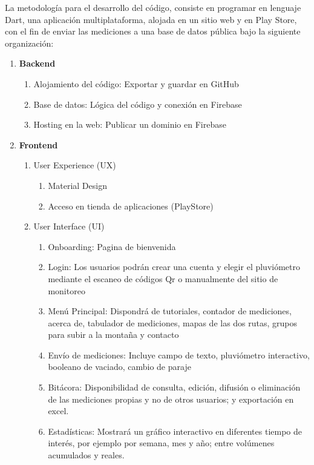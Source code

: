 La metodología para el desarrollo del código, consiste en programar en lenguaje Dart, una aplicación multiplataforma, alojada en un sitio web y en Play Store, con el fin de enviar las mediciones a una base de datos pública bajo la siguiente organización:


\begin{enumerate}
  \item \textbf{Backend}
  \begin{enumerate}
    \item Alojamiento del código: Exportar y guardar en GitHub
    \item Base de datos: Lógica del código y conexión en Firebase
    \item Hosting en la web: Publicar un dominio en Firebase
  \end{enumerate}
  \item \textbf{Frontend}
  \begin{enumerate}
    \item User Experience (UX)
     \begin{enumerate}
      \item Material Design
      \item Acceso en tienda de aplicaciones (PlayStore)
     \end{enumerate}
    \item User Interface (UI)
    \begin{enumerate}
    \item Onboarding: Pagina de bienvenida 
    \item Login: Los usuarios podrán crear una cuenta y elegir el pluviómetro mediante el escaneo de códigos Qr o manualmente del sitio de monitoreo 
    \item Menú Principal: Dispondrá de tutoriales, contador de mediciones, acerca de, tabulador de mediciones, mapas de las dos rutas, grupos para subir a la montaña y contacto
    \item Envío de mediciones: Incluye campo de texto, pluviómetro interactivo, booleano de vaciado, cambio de paraje
    \item Bitácora: Disponibilidad de consulta, edición, difusión o eliminación de las mediciones propias y no de otros usuarios; y exportación en excel.
    \item Estadísticas: Mostrará un gráfico interactivo en diferentes tiempo de interés, por ejemplo por semana, mes y año; entre volúmenes acumulados y reales.
\end{enumerate}
  \end{enumerate}
\end{enumerate}











